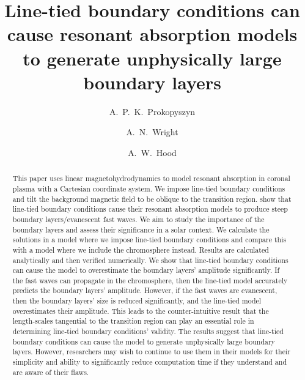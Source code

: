 \documentclass[linenumbers]{aastex63}
\begin{document}
\title{Line-tied boundary conditions can cause resonant absorption models to generate unphysically large boundary layers}


\author[0000-0002-8184-5990]{A.~P.~K.~Prokopyszyn}

\author[0000-0002-9877-1457]{A.~N.~Wright}

\author[0000-0003-2620-2068]{A.~W.~Hood}


\begin{abstract}

This paper uses linear magnetohydrodynamics to model resonant absorption in coronal plasma with a Cartesian coordinate system. We impose line-tied boundary conditions and tilt the background magnetic field to be oblique to the transition region. \citet{Halberstadt1993,Halberstadt1995,Arregui2003} show that line-tied boundary conditions cause their resonant absorption models to produce steep boundary layers/evanescent fast waves. We aim to study the importance of the boundary layers and assess their significance in a solar context. We calculate the solutions in a model where we impose line-tied boundary conditions and compare this with a model where we include the chromosphere instead. Results are calculated analytically and then verified numerically. We show that line-tied boundary conditions can cause the model to overestimate the boundary layers' amplitude significantly. If the fast waves can propagate in the chromosphere, then the line-tied model accurately predicts the boundary layers' amplitude. However, if the fast waves are evanescent, then the boundary layers' size is reduced significantly, and the line-tied model overestimates their amplitude. This leads to the counter-intuitive result that the length-scales tangential to the transition region can play an essential role in determining line-tied boundary conditions' validity. The results suggest that line-tied boundary conditions can cause the model to generate unphysically large boundary layers. However, researchers may wish to continue to use them in their models for their simplicity and ability to significantly reduce computation time if they understand and are aware of their flaws.

\end{abstract}
\end{document}
